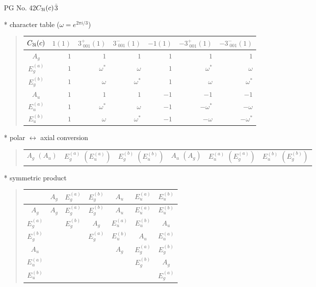 \documentclass[fleqn,8pt,landscape]{jsarticle}
\begin{document}
\setcounter{MaxMatrixCols}{32}

\renewcommand{\tablename}{Table~}
\renewcommand{\figurename}{Figure~}
\begin{center}
\LARGE
PG No. 42\quad$C_{\rm 3i}(c)$\quad$\bar{3}$\quad[ trigonal ]
\end{center}

* character table ($\omega=e^{2\pi i/3}$)
\begin{quote}
\begin{tabular}{crrrrrr} \hline \hline
$ C_{\rm 3i}(c) $ & $ 1(1) $ & $ 3^{+}_{\,\,001}(1) $ & $ 3^{-}_{\,\,001}(1) $ & $ -1(1) $ & $ -3^{+}_{\,\,001}(1) $ & $ -3^{-}_{\,\,001}(1) $ \\ \hline
$ A_{g} $ & $ 1 $ & $ 1 $ & $ 1 $ & $ 1 $ & $ 1 $ & $ 1 $ \\
$ E_{g}^{(a)} $ & $ 1 $ & $ \omega^{*} $ & $ \omega $ & $ 1 $ & $ \omega^{*} $ & $ \omega $ \\
$ E_{g}^{(b)} $ & $ 1 $ & $ \omega $ & $ \omega^{*} $ & $ 1 $ & $ \omega $ & $ \omega^{*} $ \\
$ A_{u} $ & $ 1 $ & $ 1 $ & $ 1 $ & $ -1 $ & $ -1 $ & $ -1 $ \\
$ E_{u}^{(a)} $ & $ 1 $ & $ \omega^{*} $ & $ \omega $ & $ -1 $ & $ - \omega^{*} $ & $ - \omega $ \\
$ E_{u}^{(b)} $ & $ 1 $ & $ \omega $ & $ \omega^{*} $ & $ -1 $ & $ - \omega $ & $ - \omega^{*} $ \\
 \hline \hline
\end{tabular}
\end{quote}

* polar $\leftrightarrow$ axial conversion
\begin{quote}
\begin{tabular}{cccccc}
$ A_{g}\,\,(A_{u}) $ & $ E_{g}^{(a)}\,\,(E_{u}^{(a)}) $ & $ E_{g}^{(b)}\,\,(E_{u}^{(b)}) $ & $ A_{u}\,\,(A_{g}) $ & $ E_{u}^{(a)}\,\,(E_{g}^{(a)}) $ & $ E_{u}^{(b)}\,\,(E_{g}^{(b)}) $
\end{tabular}
\end{quote}

* symmetric product
\begin{quote}
\begin{tabular}{c|cccccc} \hline \hline
 & $ A_{g} $ & $ E_{g}^{(a)} $ & $ E_{g}^{(b)} $ & $ A_{u} $ & $ E_{u}^{(a)} $ & $ E_{u}^{(b)} $ \\ \hline
$ A_{g} $ & $ A_{g} $ & $ E_{g}^{(a)} $ & $ E_{g}^{(b)} $ & $ A_{u} $ & $ E_{u}^{(a)} $ & $ E_{u}^{(b)} $ \\
$ E_{g}^{(a)} $ & $  $ & $ E_{g}^{(b)} $ & $ A_{g} $ & $ E_{u}^{(a)} $ & $ E_{u}^{(b)} $ & $ A_{u} $ \\
$ E_{g}^{(b)} $ & $  $ & $  $ & $ E_{g}^{(a)} $ & $ E_{u}^{(b)} $ & $ A_{u} $ & $ E_{u}^{(a)} $ \\
$ A_{u} $ & $  $ & $  $ & $  $ & $ A_{g} $ & $ E_{g}^{(a)} $ & $ E_{g}^{(b)} $ \\
$ E_{u}^{(a)} $ & $  $ & $  $ & $  $ & $  $ & $ E_{g}^{(b)} $ & $ A_{g} $ \\
$ E_{u}^{(b)} $ & $  $ & $  $ & $  $ & $  $ & $  $ & $ E_{g}^{(a)} $ \\
 \hline \hline
\end{tabular}
\end{quote}
\end{document}
